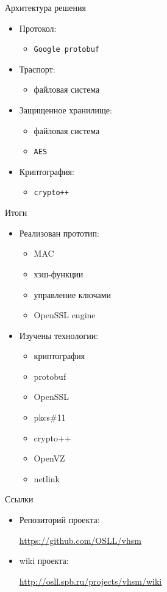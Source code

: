 \documentclass[utf8, 11pt]{beamer}
\begin{document}
\begin{frame}{Архитектура решения}
\begin{itemize}
\item Протокол:
	\begin{itemize}
	\item \texttt{Google protobuf}
	\end{itemize}
\item Траспорт:
	\begin{itemize}
	\item файловая система
	\end{itemize}
\item Защищенное хранилище:
	\begin{itemize}
	\item файловая система
	\item \texttt{AES}
	\end{itemize}
\item Криптография:
	\begin{itemize}
	\item \texttt{crypto++}
	\end{itemize}
\end{itemize}

\vspace*{\fill}
	
\end{frame}

\begin{frame}{Итоги}
\begin{itemize}
\item Реализован прототип:
	\begin{itemize}
		\item MAC
		\item хэш-функции
		\item управление ключами
		\item OpenSSL engine
	\end{itemize}
	
\item Изучены технологии:
	\begin{itemize}
		\item криптография
		\item protobuf
		\item OpenSSL
		\item pkcs\#11
		\item crypto++
		\item OpenVZ
		\item netlink
	\end{itemize}
	
\end{itemize}

\vspace*{\fill}

\end{frame}

\begin{frame}{Ссылки}
\begin{itemize}
\item Репозиторий проекта:

\url{https://github.com/OSLL/vhsm}

\item wiki проекта:

\url{http://osll.spb.ru/projects/vhsm/wiki}
\end{itemize}

\vspace*{\fill}

\end{frame}
\end{document}
